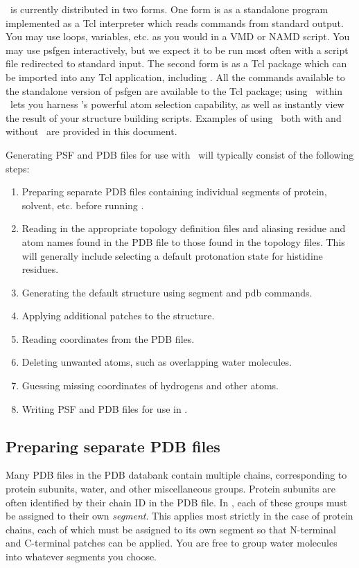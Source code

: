 \PSFGEN\ is currently distributed in two forms.  One form is as a standalone
program implemented as a Tcl interpreter which reads
commands from standard output.  You may use loops, variables, etc. as
you would in a VMD or NAMD script.  You may use psfgen interactively,
but we expect it to be run most often with a script file redirected to
standard input.  The second form is as a Tcl package which can be imported
into any Tcl application, including \VMD.  All the commands available to the
standalone version of psfgen are available to the Tcl package; using \PSFGEN\
within \VMD\ lets you harness \VMD's powerful atom selection capability, as well
as instantly view the result of your structure building scripts.  Examples
of using \PSFGEN\ both with and without \VMD\ are provided in this document.

Generating PSF and PDB files for use with \NAMD\ will typically consist of
the following steps:

\begin{enumerate}
\item Preparing separate PDB files containing individual segments of
protein, solvent, etc. before running \PSFGEN.
\item Reading in the appropriate topology definition files and aliasing
residue and atom names found in the PDB file to those found in the topology
files.  This will generally include selecting a default protonation state
for histidine residues.
\item Generating the default structure using segment and pdb commands.
\item Applying additional patches to the structure.
\item Reading coordinates from the PDB files.
\item Deleting unwanted atoms, such as overlapping water molecules.
\item Guessing missing coordinates of hydrogens and other atoms.
\item Writing PSF and PDB files for use in \NAMD.
\end{enumerate}

\subsection{Preparing separate PDB files}
Many PDB files in the PDB databank contain multiple chains, corresponding
to protein subunits, water, and other miscellaneous groups.  Protein subunits
are often identified by their chain ID in the PDB file.  In \PSFGEN, each of
these groups must be assigned to their own {\em segment}.  This applies most
strictly in the case of protein chains, each of which must be assigned to
its own segment so that N-terminal and C-terminal patches can be applied.
You are free to group water molecules into whatever segments you choose.

